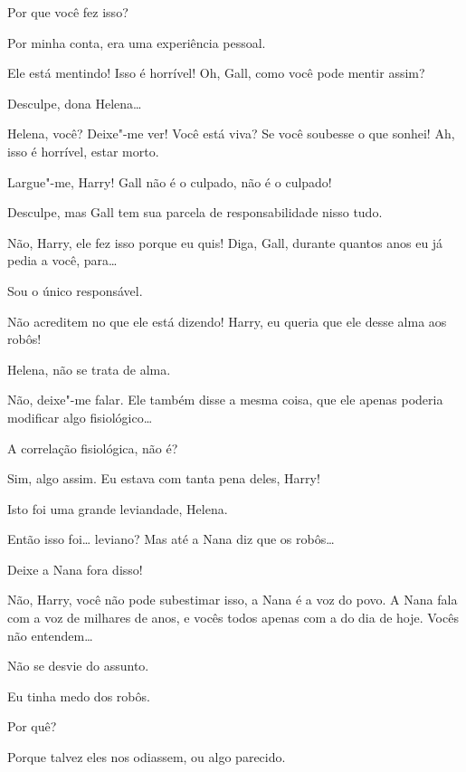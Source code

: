  Por que você fez isso? 

 Por minha conta, era uma experiência pessoal.

 Ele está mentindo! Isso é horrível! Oh, Gall, como você pode mentir assim?

 Desculpe, dona Helena\ldots{}

  Helena, você? Deixe"-me ver! Você está viva?
 Se você soubesse o que sonhei! Ah, isso é horrível,
estar morto.

 Largue"-me, Harry! Gall não é o culpado, não é o culpado!

 Desculpe, mas Gall tem sua parcela de responsabilidade nisso tudo.

 Não, Harry, ele fez isso porque eu quis! Diga, Gall, durante quantos
anos eu já pedia a você, para\ldots{}

 Sou o único responsável.

 Não acreditem no que ele está dizendo! Harry, eu queria que ele desse
alma aos robôs!

 Helena, não se trata de alma.

 Não, deixe"-me falar. Ele também disse a mesma coisa, que ele apenas
poderia modificar algo fisiológico\ldots{}

 A correlação fisiológica, não é?

 Sim, algo assim. Eu estava com tanta pena deles, Harry!

 Isto foi uma grande leviandade, Helena.

  Então isso foi\ldots{} leviano? Mas até a Nana diz
que os robôs\ldots{}

 Deixe a Nana fora disso!

 Não, Harry, você não pode subestimar isso, a Nana é a voz do povo. A
Nana fala com a voz de milhares de anos, e vocês todos apenas com a do dia de
hoje. Vocês não entendem\ldots{}

 Não se desvie do assunto.

 Eu tinha medo dos robôs.

 Por quê?

 Porque talvez eles nos odiassem, ou algo parecido.

